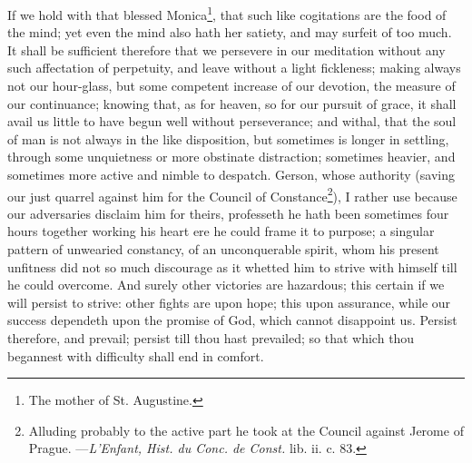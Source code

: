 If we hold with that blessed Monica\footnote{The mother of St. Augustine.}, that such like cogitations are the food of the mind; yet even the mind also hath her satiety, and may surfeit of too much. It shall be sufficient therefore that we persevere in our meditation without any such affectation of perpetuity, and leave without a light fickleness; making always not our hour-glass, but some competent increase of our devotion, the measure of our continuance; knowing that, as for heaven, so for our pursuit of grace, it shall avail us little to have begun well without perseverance; and withal, that the soul of man is not always in the like disposition, but sometimes is longer in settling, through some unquietness or more obstinate distraction; sometimes heavier, and sometimes more active and nimble to despatch. Gerson, whose authority (saving our just quarrel against him for the Council of Constance\footnote{Alluding probably to the active part he took at the Council against Jerome of Prague. ---\emph{L'Enfant, Hist. du Conc. de Const.} lib. ii. c. 83.}), I rather use because our adversaries disclaim him for theirs, professeth he hath been sometimes four hours together working his heart ere he could frame it to purpose; a singular pattern of unwearied constancy, of an unconquerable spirit, whom his present unfitness did not so much discourage as it whetted him to strive with himself till he could overcome. And surely other victories are hazardous; this certain if we will persist to strive: other fights are upon hope; this upon assurance, while our success dependeth upon the promise of God, which cannot disappoint us. Persist therefore, and prevail; persist till thou hast prevailed; so that which thou begannest with difficulty shall end in comfort. 
